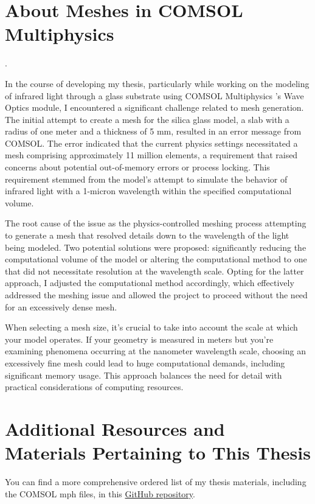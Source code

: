 \section{About Meshes in COMSOL Multiphysics}.

In the course of developing my thesis, particularly while working on the modeling of infrared light through a glass substrate using COMSOL Multiphysics \texttrademark's Wave Optics module, I encountered a significant challenge related to mesh generation. The initial attempt to create a mesh for the silica glass model, a slab with a radius of one meter and a thickness of 5 mm, resulted in an error message from COMSOL. The error indicated that the current physics settings necessitated a mesh comprising approximately 11 million elements, a requirement that raised concerns about potential out-of-memory errors or process locking. This requirement stemmed from the model's attempt to simulate the behavior of infrared light with a 1-micron wavelength within the specified computational volume.

The root cause of the issue as the physics-controlled meshing process attempting to generate a mesh that resolved details down to the wavelength of the light being modeled. Two potential solutions were proposed: significantly reducing the computational volume of the model or altering the computational method to one that did not necessitate resolution at the wavelength scale. Opting for the latter approach, I adjusted the computational method accordingly, which effectively addressed the meshing issue and allowed the project to proceed without the need for an excessively dense mesh.

When selecting a mesh size, it's crucial to take into account the scale at which your model operates. If your geometry is measured in meters but you're examining phenomena occurring at the nanometer wavelength scale, choosing an excessively fine mesh could lead to huge computational demands, including significant memory usage. This approach balances the need for detail with practical considerations of computing resources.

\section{Additional Resources and Materials Pertaining to This Thesis}

You can find a more comprehensive ordered list of my thesis materials, including the COMSOL mph files, in this \href{https://github.com/Collins-kariuk/Physics-Thesis-PDRCs.git}{GitHub repository}.
